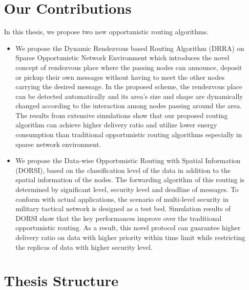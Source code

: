 \section{Our Contributions}
\label{intro:Our Contributions}
In this thesis, we propose two new opportunistic routing algorithms.
%
\begin{itemize}
	\item We propose the Dynamic Rendezvous based Routing Algorithm (DRRA) on Sparse Opportunistic Network Environment which introduces the novel concept of rendezvous place where the passing nodes can announce, deposit or pickup their own messages without having to meet the other nodes carrying the desired message.
	In the proposed scheme, the rendezvous place can be detected automatically and its area’s size and shape are dynamically changed according to the interaction among nodes passing around the area. 
	The results from extensive simulations show that our proposed routing algorithm can achieve higher delivery ratio and utilize lower energy consumption than traditional opportunistic routing algorithms especially in sparse network environment.

	\item We propose the Data-wise Opportunistic Routing with Spatial Information (DORSI), based on the classification level of the data in addition to the spatial information of the nodes. 
	The forwarding algorithm of this routing is determined by significant level, security level and deadline of messages. 
	To conform with actual applications, the scenario of multi-level security in military tactical network is designed as a test bed. 
	Simulation results of DORSI show that the key performances improve over the traditional opportunistic routing. 
	As a result, this novel protocol can guarantee higher delivery ratio on data with higher priority within time limit while restricting the replicas of data with higher security level.

\end{itemize}

\section{Thesis Structure}

